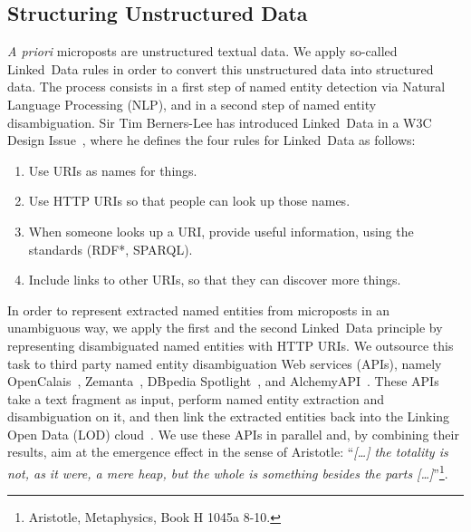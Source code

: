 \documentclass{iosart2c}
\begin{document}
\subsection{Structuring Unstructured Data}    \label{sec:services}
\textit{A priori} microposts are unstructured textual data.
We apply so-called Linked~Data rules in order to convert this unstructured data into structured data.
The process consists in a first step of named entity detection via Natural Language Processing (NLP), and in a second step of named entity disambiguation.
Sir Tim Berners-Lee has introduced Linked~Data in a W3C Design Issue~\cite{TimBL:LinkedData}, where he defines the four rules for Linked~Data as follows:
\begin{enumerate}
\item Use URIs as names for things.
\item Use HTTP URIs so that people can look up those names.
\item When someone looks up a URI, provide useful information, using the standards (RDF*, SPARQL).
\item Include links to other URIs, so that they can discover more things.
\end{enumerate}
In order to represent extracted named entities from microposts in an unambiguous way, we apply the first and the second Linked~Data principle by representing disambiguated named entities with HTTP URIs.
We outsource this task to third party named entity disambiguation Web services (APIs), namely OpenCalais~\cite{OpenCalais}, Zemanta~\cite{Zemanta}, DBpedia Spotlight~\cite{Spotlight}, and AlchemyAPI~\cite{AlchemyApi}.
These APIs take a text fragment as input, perform named entity extraction and disambiguation on it, and then link the extracted entities back into the Linking Open Data (LOD) cloud~\cite{LODcloud}.
We use these APIs in parallel and, by combining their results, aim at the emergence effect in the sense of Aristotle: ``\emph{[\ldots] the totality is not, as it were, a mere heap, but the whole is something besides the parts [\ldots]}''\footnote{Aristotle, Metaphysics, Book H 1045a 8-10.}. 
\end{document}
